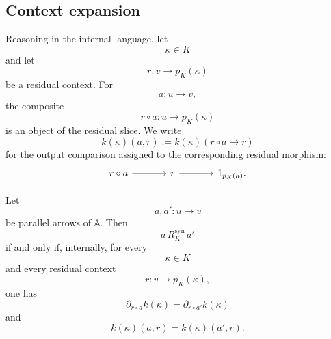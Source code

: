 \subsection{Context expansion}
\label{subsec:to-context-expansion}

Reasoning in the internal language, let
\[
    \kappa\in K
\]
and let
\[
    r:v\to p_K(\kappa)
\]
be a residual context. For
\[
    a:u\to v,
\]
the composite
\[
    r\circ a:u\to p_K(\kappa)
\]
is an object of the residual slice. We write
\[
    k(\kappa)(a,r)
    :=
    k(\kappa)(r\circ a\to r)
\]
for the output comparison assigned to the corresponding residual morphism:
\[
\begin{tikzcd}[column sep=large]
    r\circ a
        \arrow[r]
    &
    r
        \arrow[r]
    &
    1_{p_K(\kappa)}.
\end{tikzcd}
\]

\begin{theorem}
\label{thm:to-context-expansion}
    Let
    \[
        a,a':u\to v
    \]
    be parallel arrows of \(\mathbb A\). Then
    \[
        a\,R_K^{\mathrm{syn}}\,a'
    \]
    if and only if, internally, for every
    \[
        \kappa\in K
    \]
    and every residual context
    \[
        r:v\to p_K(\kappa),
    \]
    one has
    \[
        \partial_{r\circ a}k(\kappa)
        =
        \partial_{r\circ a'}k(\kappa)
    \]
    and
    \[
        k(\kappa)(a,r)
        =
        k(\kappa)(a',r).
    \]
\end{theorem}

